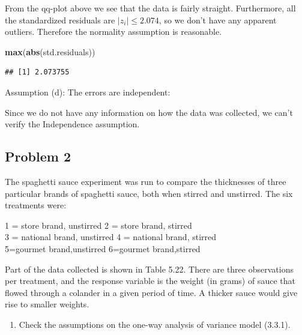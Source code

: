 \documentclass[12pt,]{article}
\newenvironment{Shaded}{\begin{snugshade}}{\end{snugshade}}
\newcommand{\KeywordTok}[1]{\textcolor[rgb]{0.13,0.29,0.53}{\textbf{#1}}}
\newcommand{\NormalTok}[1]{#1}
\providecommand{\tightlist}{%
  \setlength{\itemsep}{0pt}\setlength{\parskip}{0pt}}
\begin{document}
From the qq-plot above we see that the data is fairly straight.
Furthermore, all the standardized residuals are \(|z_i| \leq 2.074\), so
we don't have any apparent outliers. Therefore the normality assumption
is reasonable.

\begin{Shaded}
\begin{Highlighting}[]
\KeywordTok{max}\NormalTok{(}\KeywordTok{abs}\NormalTok{(std.residuals))}
\end{Highlighting}
\end{Shaded}

\begin{verbatim}
## [1] 2.073755
\end{verbatim}

Assumption (d): The errors are independent:

Since we do not have any information on how the data was collected, we
can't verify the Independence assumption.

\subsection{Problem 2}\label{problem-2}

The spaghetti sauce experiment was run to compare the thicknesses of
three particular brands of spaghetti sauce, both when stirred and
unstirred. The six treatments were:

\begin{center}
1 = store brand, unstirred 2 = store brand, stirred\\
3 = national brand, unstirred 4 = national brand, stirred \\ 
5=gourmet brand,unstirred 6=gourmet brand,stirred
\end{center}

Part of the data collected is shown in Table 5.22. There are three
observations per treatment, and the response variable is the weight (in
grams) of sauce that flowed through a colander in a given period of
time. A thicker sauce would give rise to smaller weights.

\begin{enumerate}
\def\labelenumi{(\alph{enumi})}
\tightlist
\item
  Check the assumptions on the one-way analysis of variance model
  (3.3.1).
\end{enumerate}
\end{document}
